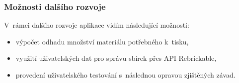 \subsubsection*{Možnosti dalšího rozvoje}\label{moznosti-dalsiho-rozvoje}

V~rámci dalšího rozvoje aplikace vidím následující možnosti:
\begin{itemize}
    \item výpočet odhadu množství materiálu potřebného k~tisku,
    \item využití uživatelských dat pro správu sbírek přes API Rebrickable,
    \item provedení uživatelského testování s~následnou opravou zjištěných závad.
\end{itemize} 
